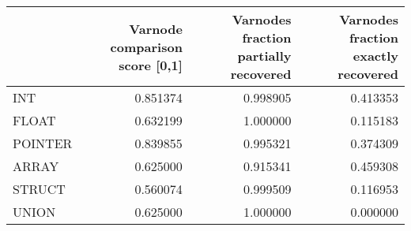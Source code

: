 \begin{tabular}{lrrr}
\toprule
{} &  Varnode comparison score [0,1] &  Varnodes fraction partially recovered &  Varnodes fraction exactly recovered \\
\midrule
INT     &                        0.851374 &                               0.998905 &                             0.413353 \\
FLOAT   &                        0.632199 &                               1.000000 &                             0.115183 \\
POINTER &                        0.839855 &                               0.995321 &                             0.374309 \\
ARRAY   &                        0.625000 &                               0.915341 &                             0.459308 \\
STRUCT  &                        0.560074 &                               0.999509 &                             0.116953 \\
UNION   &                        0.625000 &                               1.000000 &                             0.000000 \\
\bottomrule
\end{tabular}
